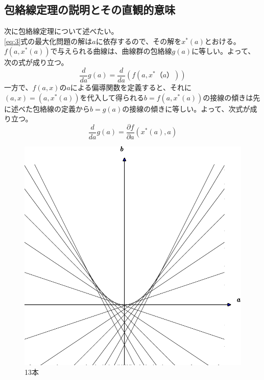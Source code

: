 \documentclass[11pt,a4j,fleqn]{jarticle}
\begin{document}
\subsection{包絡線定理の説明とその直観的意味}
次に包絡線定理について述べたい。\\
\eqref{eq:3}式の最大化問題の解は$a$に依存するので、その解を$x^* (a)$とおける。
$f(a,x^* (a))$で与えられる曲線は、曲線群の包絡線$g(a)$に等しい。よって、次の式が成り立つ。
\begin{equation}
\frac{d}{da}g(a)=\frac{d}{da}(f(a,x^*（a）))\label{eq:7}
\end{equation}
一方で、$f(a,x)$の$a$による偏導関数を定義すると、それに$(a,x)=(a,x^*(a))$を代入して得られる$b=f(a,x^* (a))$の接線の傾きは先に述べた包絡線の定義から$b=g(a)$の接線の傾きに等しい。よって、次式が成り立つ。
\begin{equation}
\frac{d}{da}g(a)=\frac{\partial f}{\partial a}(x^* (a),a) \label{eq:8}
\end{equation}
\begin{figure}[p]
 \centering
 \includegraphics[scale=0.7]{envelope0.pdf}
 \caption{13本}
 \label{fig:1}
\end{figure}
\end{document}
